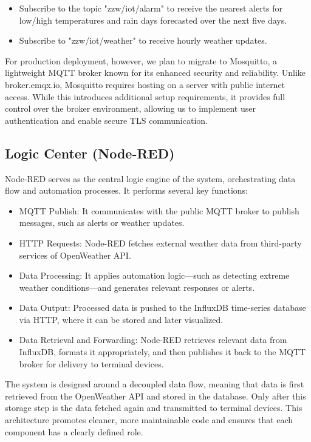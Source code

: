 \documentclass[11pt]{article}
\begin{document}
\begin{itemize}
    \item Subscribe to the topic "zzw/iot/alarm" to receive the nearest alerts for low/high temperatures and rain days forecasted over the next five days.
    \item Subscribe to "zzw/iot/weather" to receive hourly weather updates.
\end{itemize}

For production deployment, however, we plan to migrate to Mosquitto, a lightweight MQTT broker known for its enhanced security and reliability. Unlike broker.emqx.io, Mosquitto requires hosting on a server with public internet access. While this introduces additional setup requirements, it provides full control over the broker environment, allowing us to implement user authentication and enable secure TLS communication.

\subsection{Logic Center (Node-RED)}
Node-RED serves as the central logic engine of the system, orchestrating data flow and automation processes. It performs several key functions:

\begin{itemize}
    \item MQTT Publish: It communicates with the public MQTT broker to publish messages, such as alerts or weather updates.
    \item HTTP Requests: Node-RED fetches external weather data from third-party services of OpenWeather API.
    \item Data Processing: It applies automation logic—such as detecting extreme weather conditions—and generates relevant responses or alerts.
    \item Data Output: Processed data is pushed to the InfluxDB time-series database via HTTP, where it can be stored and later visualized.
    \item Data Retrieval and Forwarding: Node-RED retrieves relevant data from InfluxDB, formats it appropriately, and then publishes it back to the MQTT broker for delivery to terminal devices.
\end{itemize}

The system is designed around a decoupled data flow, meaning that data is first retrieved from the OpenWeather API and stored in the database. Only after this storage step is the data fetched again and transmitted to terminal devices. This architecture promotes cleaner, more maintainable code and ensures that each component has a clearly defined role.
\end{document}
